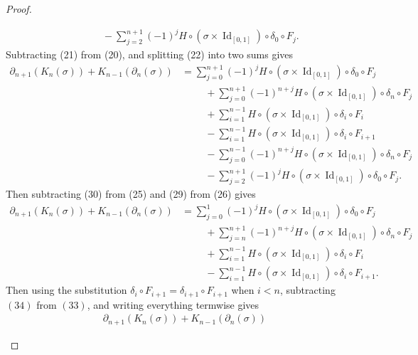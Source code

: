 \documentclass{article}
\newcommand{\id}[1]{\operatorname{Id}_{#1}}
\begin{document}
\begin{proof}
\begin{enumerate}[a.]
\begin{align}
      &\hspace{1cm}- \sum_{j=2}^{n+1} (-1)^{j} H\circ(\sigma \times \id{[0,1]}) \circ \delta_0 \circ F_j.
    \end{align}
    Subtracting (21) from (20), and
    splitting (22) into two sums gives \begin{align}
      \partial_{n+1}(K_n(\sigma)) + K_{n-1}(\partial_{n}(\sigma))
      &= \sum_{j=0}^{n+1} (-1)^{j} H\circ(\sigma \times \id{[0,1]}) \circ \delta_0 \circ F_j \\
      &\hspace{1cm}+ \sum_{j=0}^{n+1} (-1)^{n + j} H\circ(\sigma \times \id{[0,1]}) \circ \delta_n \circ F_j \\
      &\hspace{1cm}+ \sum_{i=1}^{n-1} H\circ(\sigma \times \id{[0,1]}) \circ \delta_i \circ F_i \\
      &\hspace{1cm}- \sum_{i=1}^{n-1} H\circ(\sigma \times \id{[0,1]}) \circ \delta_i \circ F_{i+1} \\
      &\hspace{1cm}- \sum_{j=0}^{n-1} (-1)^{n+j} H\circ(\sigma \times \id{[0,1]}) \circ \delta_n \circ F_j \\
      &\hspace{1cm}- \sum_{j=2}^{n+1} (-1)^{j} H\circ(\sigma \times \id{[0,1]}) \circ \delta_0 \circ F_j.
    \end{align} Then subtracting (30) from (25) and (29) from (26) gives \begin{align}
      \partial_{n+1}(K_n(\sigma)) + K_{n-1}(\partial_{n}(\sigma))
      &= \sum_{j=0}^{1} (-1)^{j} H\circ(\sigma \times \id{[0,1]}) \circ \delta_0 \circ F_j \\
      &\hspace{1cm}+ \sum_{j=n}^{n+1} (-1)^{n + j} H\circ(\sigma \times \id{[0,1]}) \circ \delta_n \circ F_j \\
      &\hspace{1cm}+ \sum_{i=1}^{n-1} H\circ(\sigma \times \id{[0,1]}) \circ \delta_i \circ F_i \\
      &\hspace{1cm}- \sum_{i=1}^{n-1} H\circ(\sigma \times \id{[0,1]}) \circ \delta_i \circ F_{i+1}.
    \end{align}
    Then using the substitution
    $\delta_i \circ F_{i+1} = \delta_{i+1} \circ F_{i+1}$
    when $i < n$, subtracting $(34)$ from $(33)$, and writing everything
    termwise gives \begin{align}
      \partial_{n+1}(K_n(\sigma)) + K_{n-1}(\partial_{n}(\sigma))

\end{align}
\end{enumerate}
\end{proof}
\end{document}
